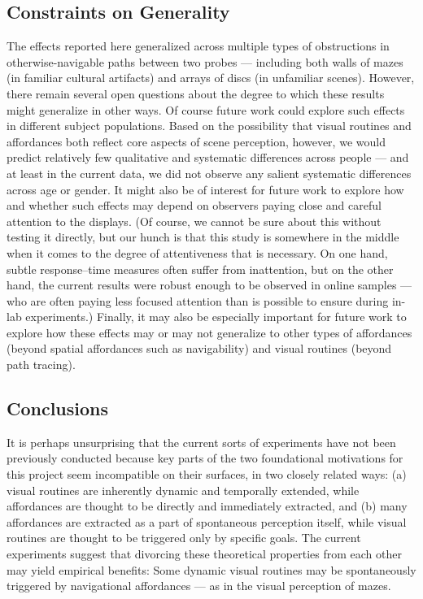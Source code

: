 \subsection{Constraints on Generality}
The effects reported here generalized across multiple types of obstructions in otherwise-navigable paths between two probes --- including both walls of mazes (in familiar cultural artifacts) and arrays of discs (in unfamiliar scenes). However, there remain several open questions about the degree to which these results might generalize in other ways. Of course future work could explore such effects in different subject populations. Based on the possibility that visual routines and affordances both reflect core aspects of scene perception, however, we would predict relatively few qualitative and systematic differences across people --- and at least in the current data, we did not observe any salient systematic differences across age or gender. It might also be of interest for future work to explore how and whether such effects may depend on observers paying close and careful attention to the displays. (Of course, we cannot be sure about this without testing it directly, but our hunch is that this study is somewhere in the middle when it comes to the degree of attentiveness that is necessary. On one hand, subtle response–time measures often suffer from inattention, but on the other hand, the current results were robust enough to be observed in online samples --- who are often paying less focused attention than is possible to ensure during in-lab experiments.) Finally, it may also be especially important for future work to explore how these effects may or may not generalize to other types of affordances (beyond spatial affordances such as navigability) and visual routines (beyond path tracing).

\subsection{Conclusions}
It is perhaps unsurprising that the current sorts of experiments have not been previously conducted because key parts of the two foundational motivations for this project seem incompatible on their surfaces, in two closely related ways: (a) visual routines are inherently dynamic and temporally extended, while affordances are thought to be directly and immediately extracted, and (b) many affordances are extracted as a part of spontaneous perception itself, while visual routines are thought to be triggered only by specific goals. The current experiments suggest that divorcing these theoretical properties from each other may yield empirical benefits: Some dynamic visual routines may be spontaneously triggered by navigational affordances --- as in the visual perception of mazes.